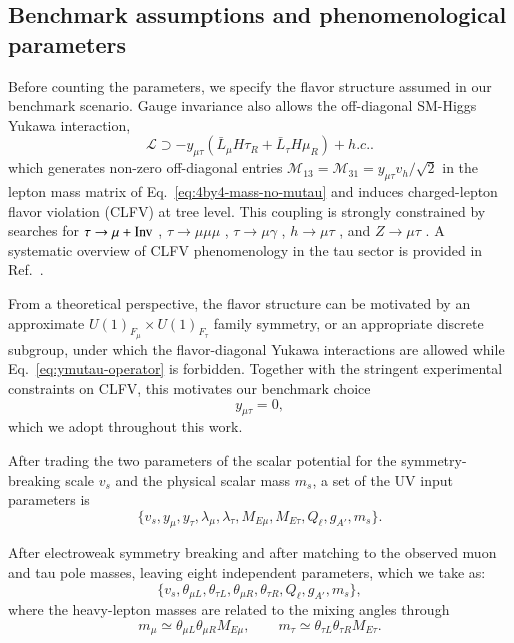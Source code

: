 \documentclass[onecolumn, aps, nofootinbib, prd, preprint, floats, floatfix, amsmath, amssymb, superscriptaddress, preprintnumbers]{revtex4-2}
\begin{document}
\subsection{Benchmark assumptions and phenomenological parameters}

Before counting the parameters, we specify the flavor structure assumed in our benchmark scenario. Gauge invariance also allows the off-diagonal SM-Higgs Yukawa interaction,
\begin{equation}
    \mathcal{L}\supset
    -y_{\mu\tau}(\bar{L}_{\mu}H \tau_R + \bar{L}_{\tau}H \mu_R)+h.c. .
\label{eq:ymutau-operator}
\end{equation}
which generates non-zero off-diagonal entries
$\mathcal{M}_{13}=\mathcal{M}_{31}=y_{\mu\tau}v_h/\sqrt{2}$
in the lepton mass matrix of Eq.~\eqref{eq:4by4-mass-no-mutau} and induces charged-lepton flavor violation (CLFV) at tree level. This coupling is strongly constrained by searches for
$\tau\to\mu+{\rm Inv}$ \cite{Ibarra:2021xyk},
$\tau\to\mu\mu\mu$ \cite{Ibarra:2021xyk,Hayasaka:2010np,Belle-II:2024sce},
$\tau\to\mu\gamma$ \cite{Belle:2021ysv},
$h\to\mu\tau$ \cite{Harnik:2012pb,CMS:2021rsq}, and
$Z\to\mu\tau$ \cite{ATLAS:2021bdj}.
A systematic overview of CLFV phenomenology in the tau sector is provided in Ref.~\cite{Banerjee:2022xuw}.

From a theoretical perspective, the flavor structure can be motivated by an approximate
$U(1)_{F_\mu}\times U(1)_{F_\tau}$ family symmetry, or an appropriate discrete subgroup, under which the flavor-diagonal Yukawa interactions are allowed while Eq.~\eqref{eq:ymutau-operator} is forbidden. Together with the stringent experimental constraints on CLFV, this motivates our benchmark choice
\begin{equation}
y_{\mu\tau}=0,
\end{equation}
which we adopt throughout this work.



After trading the two parameters of the scalar potential for the symmetry-breaking scale $v_s$ and the physical scalar mass $m_s$, a set of the UV input parameters is
\begin{equation}
    \{v_s, y_\mu, y_\tau, \lambda_\mu,\lambda_\tau, M_{E\mu}, M_{E\tau}, Q_\ell, g_{A'}, m_s \}.
\end{equation}

After electroweak symmetry breaking and after matching to the observed muon and tau pole masses, leaving eight independent parameters, which we take as:
\begin{equation}
    \{v_s, \theta_{\mu L}, \theta_{\tau L}, \theta_{\mu R},\theta_{\tau R}, Q_\ell, g_{A'}, m_s \},
    \end{equation}
where the heavy-lepton masses are related to the mixing angles through
\begin{equation}
    m_\mu\simeq \theta_{\mu L} \theta_{\mu R} M_{E\mu}, \qquad
    m_\tau\simeq \theta_{\tau L} \theta_{\tau R} M_{E\tau}.
    \end{equation}
\end{document}
